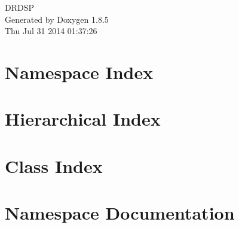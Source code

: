 \documentclass[twoside]{book}
\newcommand{\clearemptydoublepage}{%
  \newpage{\pagestyle{empty}\cleardoublepage}%
}
\begin{document}
\hypersetup{pageanchor=false}
\begin{titlepage}
\vspace*{7cm}
\begin{center}%
{\Large D\-R\-D\-S\-P }\\
\vspace*{1cm}
{\large Generated by Doxygen 1.8.5}\\
\vspace*{0.5cm}
{\small Thu Jul 31 2014 01:37:26}\\
\end{center}
\end{titlepage}
\clearemptydoublepage
\tableofcontents
\clearemptydoublepage
{}
\hypersetup{pageanchor=true}

\chapter{Namespace Index}

\chapter{Hierarchical Index}

\chapter{Class Index}

\chapter{Namespace Documentation}

\end{document}
